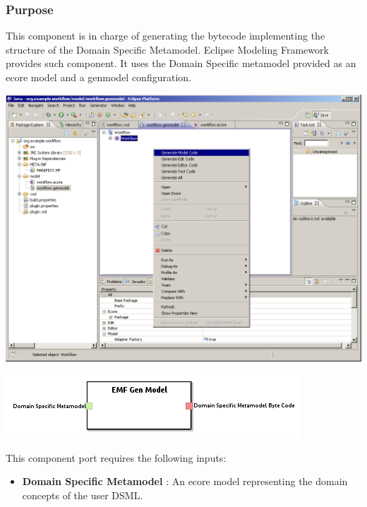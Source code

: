 \documentclass{gemoc} %
\begin{document}

\subsubsection{Purpose}
This component is in charge of generating the bytecode implementing the structure of the Domain Specific Metamodel. Eclipse Modeling Framework provides such component. It uses the Domain Specific metamodel provided as an ecore model and a genmodel configuration.
\begin{center}
\includegraphics*[trim=0.0cm 0.0cm 0cm 0.0cm, clip=true, width=1.0\linewidth]{../images/EMFGenModel.png}
\end{center}

\begin{center}
\includegraphics*[trim=0.0cm 0.0cm 0cm 0.0cm, clip=true]{../images/generated/Generated_EMF_Gen_Model.png}
\end{center}

This component port requires the following inputs:
\begin{itemize}
  \item \textbf{Domain Specific Metamodel} :
An ecore model representing the domain concepts of the user DSML.
\end{itemize}
\end{document}
